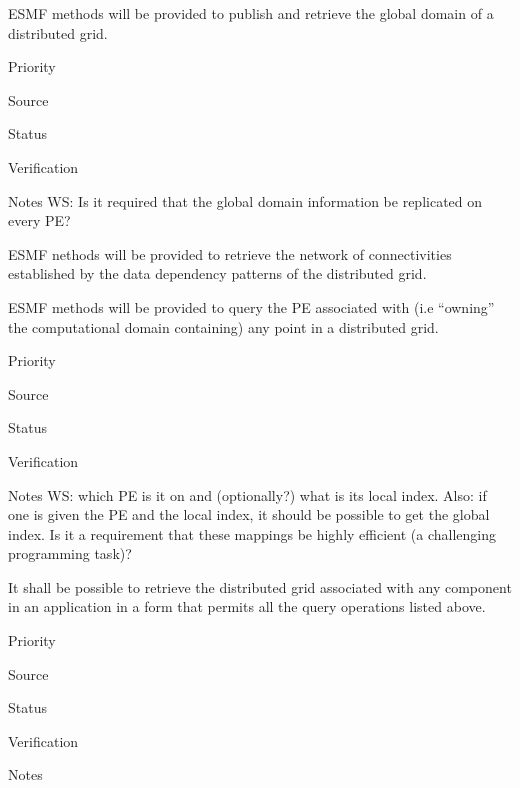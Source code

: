 
ESMF methods will be provided to publish and retrieve the global
domain of a distributed grid.

\begin{reqlist}
\item[Priority]
\item[Source]
\item[Status]
\item[Verification]
\item[Notes] WS: Is it required that the global domain information 
be replicated on every PE?

\end{reqlist}


ESMF nethods will be provided to retrieve the network of
connectivities established by the data dependency patterns of the
distributed grid.


ESMF methods will be provided to query the PE associated with (i.e
``owning'' the computational domain containing) any point in a
distributed grid.

\begin{reqlist}
\item[Priority]
\item[Source]
\item[Status]
\item[Verification]
\item[Notes] WS: which PE is it on and (optionally?) what 
is its local index.  Also: if one is given the PE and the local index, 
it should be possible to get the global index.  Is it a requirement that
these mappings be highly efficient (a challenging programming task)?
\end{reqlist}


It shall be possible to retrieve the distributed grid associated with
any component in an application in a form that permits all the query
operations listed above.

\begin{reqlist}
\item[Priority]
\item[Source]
\item[Status]
\item[Verification]
\item[Notes]
\end{reqlist}

